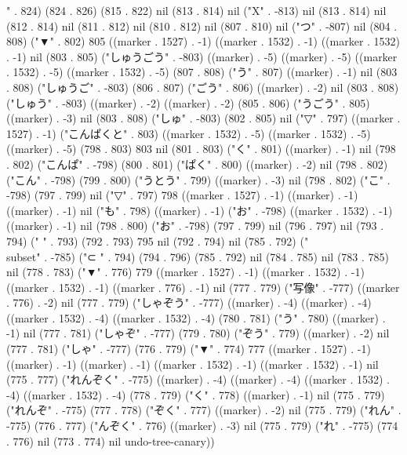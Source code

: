 " . 824) (824 . 826) (815 . 822) nil (813 . 814) nil ("X" . -813) nil (813 . 814) nil (812 . 814) nil (811 . 812) nil (810 . 812) nil (807 . 810) nil ("つ" . -807) nil (804 . 808) ("▼" . 802) 805 ((marker . 1527) . -1) ((marker . 1532) . -1) ((marker . 1532) . -1) nil (803 . 805) ("しゅうごう" . -803) ((marker) . -5) ((marker) . -5) ((marker . 1532) . -5) ((marker . 1532) . -5) (807 . 808) ("う" . 807) ((marker) . -1) nil (803 . 808) ("しゅうご" . -803) (806 . 807) ("ごう" . 806) ((marker) . -2) nil (803 . 808) ("しゅう" . -803) ((marker) . -2) ((marker) . -2) (805 . 806) ("うごう" . 805) ((marker) . -3) nil (803 . 808) ("しゅ" . -803) (802 . 805) nil ("▽" . 797) ((marker . 1527) . -1) ("こんぱくと" . 803) ((marker . 1532) . -5) ((marker . 1532) . -5) ((marker) . -5) (798 . 803) 803 nil (801 . 803) ("く" . 801) ((marker) . -1) nil (798 . 802) ("こんぱ" . -798) (800 . 801) ("ぱく" . 800) ((marker) . -2) nil (798 . 802) ("こん" . -798) (799 . 800) ("うとう" . 799) ((marker) . -3) nil (798 . 802) ("こ" . -798) (797 . 799) nil ("▽" . 797) 798 ((marker . 1527) . -1) ((marker) . -1) ((marker) . -1) nil ("も" . 798) ((marker) . -1) ("お" . -798) ((marker . 1532) . -1) ((marker) . -1) nil (798 . 800) ("お" . -798) (797 . 799) nil (796 . 797) nil (793 . 794) (" " . 793) (792 . 793) 795 nil (792 . 794) nil (785 . 792) ("\\subset" . -785) ("⊂
" . 794) (794 . 796) (785 . 792) nil (784 . 785) nil (783 . 785) nil (778 . 783) ("▼" . 776) 779 ((marker . 1527) . -1) ((marker . 1532) . -1) ((marker . 1532) . -1) ((marker . 776) . -1) nil (777 . 779) ("写像" . -777) ((marker . 776) . -2) nil (777 . 779) ("しゃぞう" . -777) ((marker) . -4) ((marker) . -4) ((marker . 1532) . -4) ((marker . 1532) . -4) (780 . 781) ("う" . 780) ((marker) . -1) nil (777 . 781) ("しゃぞ" . -777) (779 . 780) ("ぞう" . 779) ((marker) . -2) nil (777 . 781) ("しゃ" . -777) (776 . 779) ("▼" . 774) 777 ((marker . 1527) . -1) ((marker) . -1) ((marker) . -1) ((marker . 1532) . -1) ((marker . 1532) . -1) nil (775 . 777) ("れんぞく" . -775) ((marker) . -4) ((marker) . -4) ((marker . 1532) . -4) ((marker . 1532) . -4) (778 . 779) ("く" . 778) ((marker) . -1) nil (775 . 779) ("れんぞ" . -775) (777 . 778) ("ぞく" . 777) ((marker) . -2) nil (775 . 779) ("れん" . -775) (776 . 777) ("んぞく" . 776) ((marker) . -3) nil (775 . 779) ("れ" . -775) (774 . 776) nil (773 . 774) nil undo-tree-canary))
